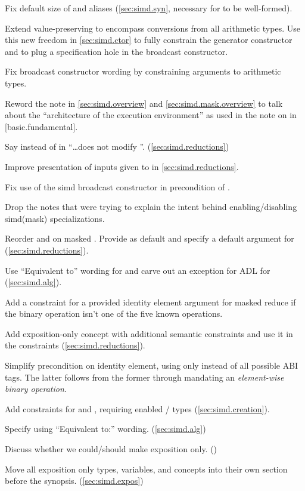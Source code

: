 \begin{revision}
\item Fix default size of  and  aliases
  (\ref{sec:simd.syn}, necessary for
  \std{} to be well-formed).
\item Extend value-preserving to encompass conversions from all arithmetic
  types. Use this new freedom in \ref{sec:simd.ctor} to fully constrain the
  generator constructor and to plug a specification hole in the broadcast
  constructor.
\item Fix broadcast constructor wording by constraining \constexprwrapperlike
  arguments to arithmetic types.
\item Reword the note in \ref{sec:simd.overview} and
  \ref{sec:simd.mask.overview} to talk about the “architecture of the execution
  environment” as used in the note on  in [basic.fundamental].
\item Say  instead of  in “\ldots does
  not modify ”. (\ref{sec:simd.reductions})
\item Improve presentation of inputs given to
   in \ref{sec:simd.reductions}.
\item Fix use of the simd broadcast constructor in precondition of
  .
\item Drop the notes that were trying to explain the intent behind
  enabling/disabling simd(mask) specializations.
\item Reorder  and  on masked
  . Provide  as default 
  and specify a default argument for 
  (\ref{sec:simd.reductions}).
\item Use “Equivalent to” wording for  and carve out an
  exception for ADL for \simdselect (\ref{sec:simd.alg}).
\item Add a constraint for a provided identity element argument for masked
  reduce if the binary operation isn't one of the five known operations.
\item Add exposition-only concept \reductionoperation with additional semantic
  constraints and use it in the  constraints
  (\ref{sec:simd.reductions}).
\item Simplify precondition on identity element, using only 
  instead of all possible ABI tags. The latter follows from the former through
  mandating an \emph{element-wise binary operation}.
\item Add constraints for  and , requiring
  enabled / types
  (\ref{sec:simd.creation}).
\item Specify  using “Equivalent to:” wording.
  (\ref{sec:simd.alg})
\item Discuss whether we could/should make  exposition only.
  ()
\item Move all exposition only types, variables, and concepts into their own
  section before the synopsis. (\ref{sec:simd.expos})

\end{revision}
